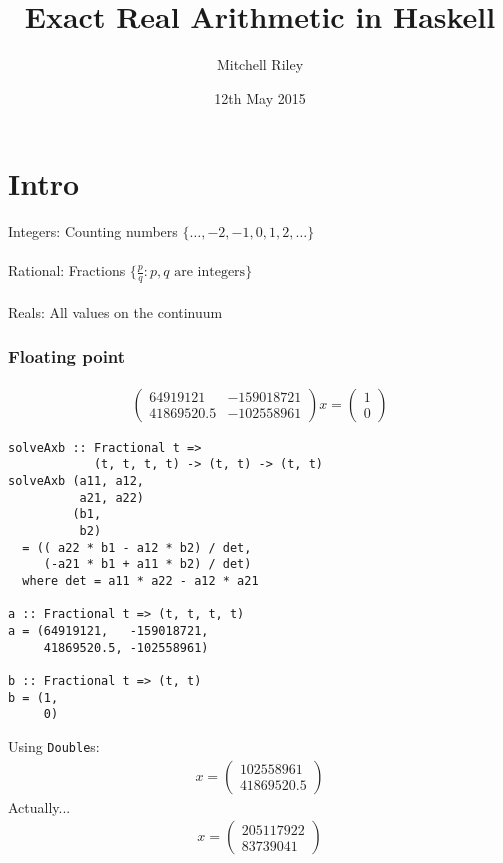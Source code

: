 \documentclass[11pt,aspectratio=169]{beamer}
\author{Mitchell Riley}
\title{Exact Real Arithmetic in Haskell}
\date{12th May 2015}
\begin{document}
\begin{frame}
\titlepage
\end{frame}

\section{Intro}

\begin{frame}
Integers: Counting numbers $\{\dots, -2, -1, 0, 1, 2, \dots\}$
\\~\\
Rational: Fractions $\{\frac{p}{q} : p, q \text{ are integers}\}$
\\~\\
Reals: All values on the continuum
\end{frame}

\begin{frame}
\frametitle{Floating point}
\begin{align*}
\begin{pmatrix}
64919121   & -159018721 \\
41869520.5 & -102558961
\end{pmatrix} x =
\begin{pmatrix}
1 \\
0
\end{pmatrix}
\end{align*}
\end{frame}

\begin{frame}[fragile]
\begin{verbatim}
solveAxb :: Fractional t =>
            (t, t, t, t) -> (t, t) -> (t, t)
solveAxb (a11, a12,
          a21, a22)
         (b1,
          b2)
  = (( a22 * b1 - a12 * b2) / det,
     (-a21 * b1 + a11 * b2) / det)
  where det = a11 * a22 - a12 * a21

a :: Fractional t => (t, t, t, t)
a = (64919121,   -159018721,
     41869520.5, -102558961)

b :: Fractional t => (t, t)
b = (1,
     0)
\end{verbatim}
\end{frame}

\begin{frame}
Using \texttt{Double}s:
\begin{align*}
x =
\begin{pmatrix}
102558961 \\
41869520.5
\end{pmatrix}
\end{align*}
\pause
Actually...
\begin{align*}
x =
\begin{pmatrix}
205117922 \\
83739041
\end{pmatrix}
\end{align*}
\end{frame}
\end{document}
